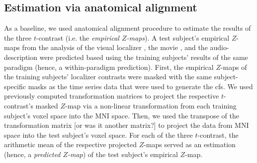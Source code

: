 \subsection{Estimation via anatomical alignment}


%
As a baseline, we used anatomical alignment procedure to estimate the results of
the three $t$-contrast (i.e. the \textit{empirical $Z$-maps}).
%
A test subject's empirical $Z$-maps from the analysis of
%
the visual localizer \citep{sengupta2016extension},
%
the movie \citep{haeusler2022processing}, and
%
the audio-description \citep{haeusler2022processing}
%
were predicted based using the training subjects' results of the same paradigm
(hence, a within-paradigm prediction).
%
First, the empirical $Z$-maps of the training subjects' localizer contrasts were
masked with the same subject-specific masks as the time series data that were
used to generate the \ac{cfs}.
We used previously computed transformation matrices
\citep[][\href{https://github.com/psychoinformatics-de/studyforrest-data-templatetransforms}{\url{github.com/psychoinformatics-de/studyforrest-data-templatetransforms}}]{hanke2014audiomovie}
to project the respective $t$-contrast's masked $Z$-map via a non-linear
transformation from each training subject's voxel space into the MNI space.
Then, we used the transpose of the transformation matrix [or was it another
matrix?] to project the data from MNI space into the test
subject's voxel space.
For each of the three $t$-contrast, the arithmetic mean of the respective
projected $Z$-maps served as an estimation (hence, a \textit{predicted $Z$-map})
of the test subject's empirical $Z$-map.




